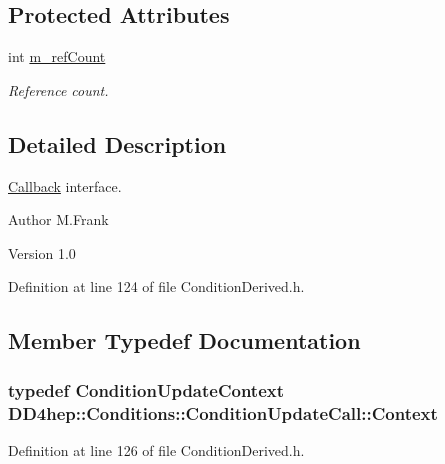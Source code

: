 \subsection*{Protected Attributes}
\begin{DoxyCompactItemize}
\item 
int \hyperlink{class_d_d4hep_1_1_conditions_1_1_condition_update_call_a7456626d494306f498809d5d57150b28}{m\_\-refCount}
\begin{DoxyCompactList}\small\item\em Reference count. \item\end{DoxyCompactList}\end{DoxyCompactItemize}


\subsection{Detailed Description}
\hyperlink{class_d_d4hep_1_1_callback}{Callback} interface. \begin{DoxyAuthor}{Author}
M.Frank 
\end{DoxyAuthor}
\begin{DoxyVersion}{Version}
1.0 
\end{DoxyVersion}


Definition at line 124 of file ConditionDerived.h.

\subsection{Member Typedef Documentation}
\hypertarget{class_d_d4hep_1_1_conditions_1_1_condition_update_call_a96b8a912f3a2ea17f139a5f5dcac7146}{
\subsubsection[{Context}]{\setlength{\rightskip}{0pt plus 5cm}typedef {\bf ConditionUpdateContext} {\bf DD4hep::Conditions::ConditionUpdateCall::Context}}}
\label{class_d_d4hep_1_1_conditions_1_1_condition_update_call_a96b8a912f3a2ea17f139a5f5dcac7146}


Definition at line 126 of file ConditionDerived.h.

